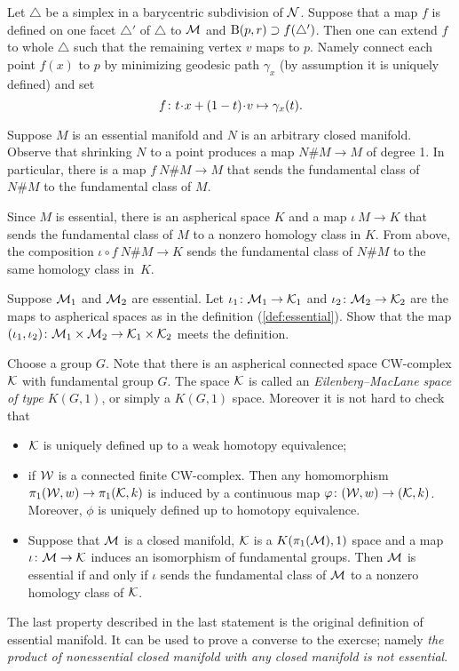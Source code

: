 Let $\triangle$ be a simplex in a barycentric subdivision of $\mathcal{N}$.
Suppose that a map $f$ is defined on one facet $\triangle'$ of $\triangle$ to $\mathcal{M}$ and $\mathrm{B}{}(p,r)\supset f(\triangle')$.
Then one can extend $f$ to whole $\triangle$ such that the remaining vertex $v$ maps to $p$.
Namely connect each point $f(x)$ to $p$ by minimizing geodesic path $\gamma_x$ (by assumption it is uniquely defined) and set
\[f
\:
t\cdot x\z+(1-t)\cdot v
\mapsto
\gamma_x(t).\]

Suppose $M$ is an essential manifold and $N$ is an arbitrary closed manifold.
Observe that shrinking $N$ to a point produces a map $N\#M\to M$ of degree 1.
In particular, there is a map $f\:N\#M\to M$ that sends the fundamental class of $N\#M$ to the fundamental class of $M$.

Since $M$ is essential, there is an aspherical space $K$ and a map $\iota\:M\to K$ that sends the fundamental class of $M$ to a nonzero homology class in $K$.
From above, the composition $\iota\circ f\:N\#M\to K$ sends the fundamental class of $N\#M$ to the same homology class in~$K$.


Suppose $\mathcal{M}_1$ and $\mathcal{M}_2$ are essential.
Let $\iota_1\colon\mathcal{M}_1\to\mathcal{K}_1$ and $\iota_2\colon\mathcal{M}_2\to\mathcal{K}_2$ are the maps to aspherical spaces as in the definition (\ref{def:essential}).
Show that the map
$(\iota_1,\iota_2)\colon\mathcal{M}_1\times\mathcal{M}_2\to\mathcal{K}_1\times\mathcal{K}_2$
meets the definition.

Choose a group $G$.
Note that there is an aspherical connected space CW-complex $\mathcal{K}$ with fundamental group $G$.
The space $\mathcal{K}$ is called an \emph{Eilenberg--MacLane space of type $K(G,1)$}, or simply a $K(G,1)$ space.
Moreover it is not hard to check that
\begin{itemize}
\item $\mathcal{K}$ is uniquely defined up to a weak homotopy equivalence;
\item if $\mathcal{W}$ is a connected finite CW-complex.
Then any homomorphism $\pi_1(\mathcal{W},w)\to\pi_1(\mathcal{K},k)$ is induced by a continuous map $\varphi\colon(\mathcal{W},w)\to(\mathcal{K},k)$.
Moreover, $\phi$ is uniquely defined up to homotopy equivalence.
\end{itemize}

\begin{itemize}
 \item Suppose that $\mathcal{M}$ is a closed manifold, 
$\mathcal{K}$ is a $K(\pi_1(\mathcal{M}),1)$ space and a map $\iota\colon\mathcal{M}\to \mathcal{K}$ induces an isomorphism of fundamental groups.
Then $\mathcal{M}$ is essential if and only if $\iota$ sends the fundamental class of $\mathcal{M}$ to a nonzero homology class of $\mathcal{K}$.
\end{itemize}

The last property described in the last statement is the original definition of essential manifold.
It can be used to prove a converse to the exercse;
namely \emph{the product of nonessential closed manifold with any closed manifold is \emph{not} essential}.



